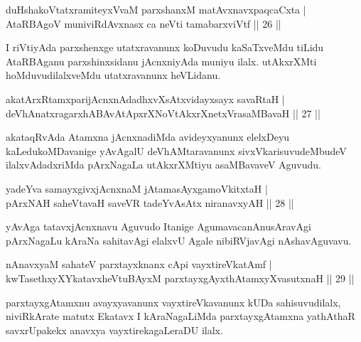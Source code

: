 \begin{shl}
duHshakoVtatxramiteyxVvaM parxshanxM matAvx\s navxpaqcaCxta |\\
AtaRBAgoV muniviRdAvxnasx ca neVti tamabarxviVtf \hfill || 26 ||
\end{shl}

\begin{artha}
I riVtiyAda parxshenxge utatxravanunx koDuvudu kaSaTxveMdu tiLidu AtaRBAganu 
parxshinxsidanu jAcnxniyAda muniyu ilalx. utAkxrXMti hoMduvudilalxveMdu utatxravanunx 
heVLidanu.
\end{artha}

\begin{shl}
akatArxRtamxparijAcnxnAdadhxvXsAtxvidayxsayx savaRtaH |\\
deVhAnatxragarxhABAvAtApxrXNoVtAkxrXnetxVrasaMBavaH \hfill || 27 ||
\end{shl}

\begin{artha}
akataqRvAda Atamxna jAcnxnadiMda avideyxyanunx elelxDeyu kaLedukoMDavanige yAvAgalU deVhAMtaravanunx sivxVkarisuvudeMbudeV ilalxvAdadxriMda pArxNagaLa utAkxrXMtiyu asaMBavaveV Aguvudu.
\end{artha}

\begin{shl}
yadeYva samayxgivxjAcnxnaM jAtamasAyx\s \s gamoVkitxtaH |\\
pArxNAH saheVtavaH saveVR tadeYvAsAtx niranavxyAH \hfill || 28 ||
\end{shl}

\begin{artha}
yAvAga tatavxjAcnxnavu Aguvudo Itanige AgumavacanAnusAravAgi pArxNagaLu kAraNa sahitavAgi elalxvU Agale nibiRVjavAgi nAshavAguvavu.
\end{artha}

\begin{shl}
nAnavxyaM sahateV parxtayxknanx cApi vayxtireVkatAmf |\\
kwTasethxyXYkatavxheVtuBAyxM parxtayxgAyxthAtamxyXvasutxnaH \hfill || 29 ||
\end{shl}

\begin{artha}
parxtayxgAtamxnu avayxyavanunx vayxtireVkavanunx kUDa sahisuvudilalx, niviRkArate matutx Ekatavx I kAraNagaLiMda parxtayxgAtamxna yathAthaR savxrUpakekx anavxya vayxtirekagaLeraDU ilalx.
\end{artha}


